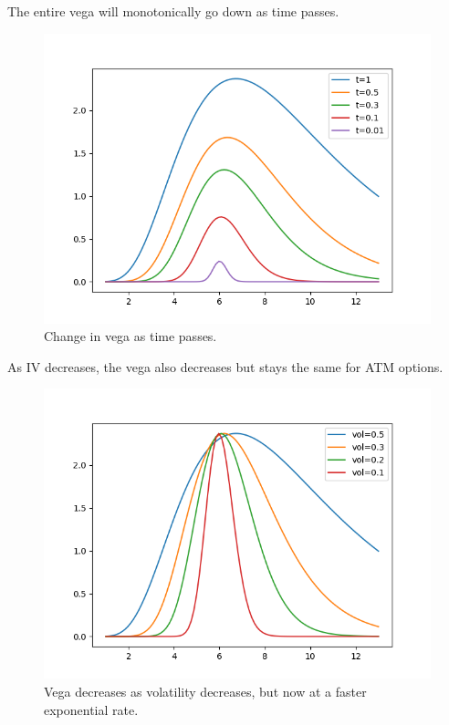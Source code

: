 \documentclass{article}
\begin{document}
    \begin{theorem}
      The entire vega will monotonically go down as time passes. 
      \begin{figure}[H]
        \centering 
        \includegraphics[scale=0.4]{img/vega_wrt_time.png}
        \caption{Change in vega as time passes.} 
        \label{fig:vega_wrt_time}
      \end{figure}
    \end{theorem}

    \begin{theorem}
      As IV decreases, the vega also decreases but stays the same for ATM options. 
      \begin{figure}[H]
        \centering 
        \includegraphics[scale=0.4]{img/vega_wrt_vol.png}
        \caption{Vega decreases as volatility decreases, but now at a faster exponential rate. } 
        \label{fig:vega_wrt_vol}
      \end{figure}
    \end{theorem}
\end{document}
